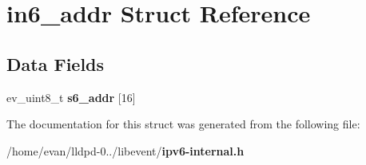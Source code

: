 \section{in6\-\_\-addr \-Struct \-Reference}
\label{structin6__addr}
\subsection*{\-Data \-Fields}
\begin{DoxyCompactItemize}
\item 
ev\-\_\-uint8\-\_\-t {\bfseries s6\-\_\-addr} [16]\label{structin6__addr_ae1c9b683ba12f2421d2fe086ef444fdb}

\end{DoxyCompactItemize}


\-The documentation for this struct was generated from the following file\-:\begin{DoxyCompactItemize}
\item 
/home/evan/lldpd-\/0../libevent/{\bf ipv6-\/internal.\-h}\end{DoxyCompactItemize}
